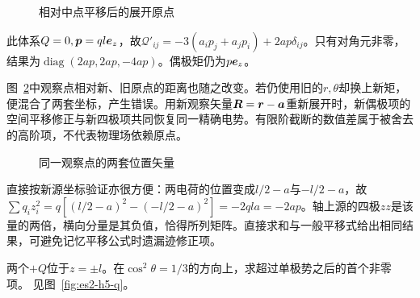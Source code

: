 \begin{figure}[H]\centering
{}
\caption{相对中点平移后的展开原点}\label{fig:es2-h4-q}
\end{figure}
\begin{solution}
此体系$Q=0,\bm{p}=ql\bm{e}_z$，故$\mathcal Q'_{ij}=-3(a_ip_j+a_jp_i)+2ap\delta_{ij}$。只有对角元非零，结果为$\operatorname{diag}(2ap,2ap,-4ap)$。偶极矩仍为$p\bm{e}_z$。

图~\ref{fig:es2-h4-s}中观察点相对新、旧原点的距离也随之改变。若仍使用旧的$r,\theta$却换上新矩，便混合了两套坐标，产生错误。用新观察矢量$\bm{R}=\bm{r}-\bm{a}$重新展开时，新偶极项的空间平移修正与新四极项共同恢复同一精确电势。有限阶截断的数值差属于被舍去的高阶项，不代表物理场依赖原点。
\begin{figure}[H]\centering
{}
\caption{同一观察点的两套位置矢量}\label{fig:es2-h4-s}
\end{figure}


直接按新源坐标验证亦很方便：两电荷的位置变成$l/2-a$与$-l/2-a$，故$\sum q_i z_i^2=q[(l/2-a)^2-(-l/2-a)^2]=-2qla=-2ap$。轴上源的四极$zz$是该量的两倍，横向分量是其负值，恰得所列矩阵。直接求和与一般平移式给出相同结果，可避免记忆平移公式时遗漏迹修正项。
\end{solution}

\begin{exercise}[四极角因子为零的观察方向]\label{ex:es2-h5}
两个$+Q$位于$z=\pm l$。在$\cos^2\theta=1/3$的方向上，求超过单极势之后的首个非零项。 见图~\ref{fig:es2-h5-q}。
\end{exercise}

